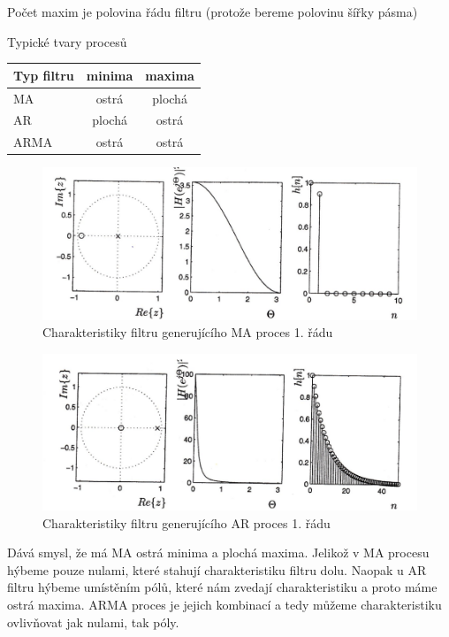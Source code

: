 \documentclass[a4paper,12pt]{article}   %
\begin{document}
Počet maxim je polovina řádu filtru (protože bereme polovinu šířky pásma) 


Typické tvary procesů
\begin{table}[h!]
        \centering
        \begin{tabular}{|l|c|c|}
                \hline
                Typ filtru & minima & maxima \\\hline\hline
                MA & ostrá & plochá \\\hline
                AR & plochá & ostrá \\\hline
                ARMA & ostrá & ostrá\\\hline
        \end{tabular}
\end{table}

\begin{figure}[h!]
        \centering
        \includegraphics[width=.6\textwidth]{fig/MA_filter.png}
        \caption*{Charakteristiky filtru generujícího MA proces 1. řádu}
        \label{fig:MA:filter}
\end{figure}

\begin{figure}[h!]
        \centering
        \includegraphics[width=.6\textwidth]{fig/AR_filter.png}
        \caption*{Charakteristiky filtru generujícího AR proces 1. řádu}
        \label{fig:AR:filter}
\end{figure}
\FloatBarrier

Dává smysl, že má MA ostrá minima a plochá maxima. Jelikož v MA procesu hýbeme pouze nulami, které stahují charakteristiku filtru dolu. Naopak u AR filtru hýbeme umístěním pólů, které nám zvedají charakteristiku a proto máme ostrá maxima. ARMA proces je jejich kombinací a tedy můžeme charakteristiku ovlivňovat jak nulami, tak póly. 
\end{document}
